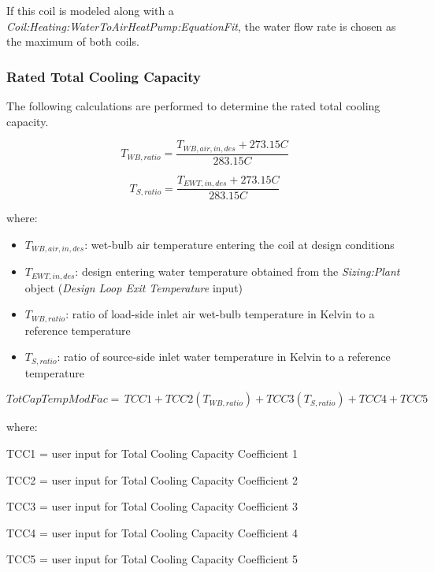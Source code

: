 If this coil is modeled along with a \emph{Coil:Heating:WaterToAirHeatPump:EquationFit}, the water flow rate is chosen as the maximum of both coils.

\subsubsection{Rated Total Cooling Capacity}\label{rated-total-cooling-capacity}

The following calculations are performed to determine the rated total cooling capacity.

\begin{equation}
  T_{WB,ratio} = \frac{T_{WB,air,in,des}+273.15C}{283.15C}
\end{equation}

\begin{equation}
  T_{S,ratio} = \frac{T_{EWT,in,des}+273.15C}{283.15C}
\end{equation}

where:

\begin{itemize}
\item $T_{WB,air,in,des}$: wet-bulb air temperature entering the coil at design conditions
\item $T_{EWT,in,des}$: design entering water temperature obtained from the \emph{Sizing:Plant} object (\emph{Design Loop Exit Temperature} input)
\item $T_{WB,ratio}$: ratio of load-side inlet air wet-bulb temperature in Kelvin to a reference temperature
\item $T_{S,ratio}$: ratio of source-side inlet water temperature in Kelvin to a reference temperature
\end{itemize}

\begin{equation}
TotCapTempModFac = \,TCC1 + TCC2\left( {{T_{WB,ratio}}} \right) + TCC3\left( {{T_{S,ratio}}} \right) + TCC4 + TCC5
\end{equation}

where:

TCC1 = user input for Total Cooling Capacity Coefficient 1

TCC2 = user input for Total Cooling Capacity Coefficient 2

TCC3 = user input for Total Cooling Capacity Coefficient 3

TCC4 = user input for Total Cooling Capacity Coefficient 4

TCC5 = user input for Total Cooling Capacity Coefficient 5


